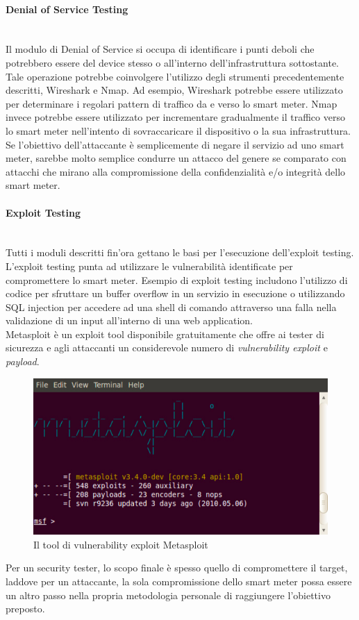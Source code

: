 \paragraph{Denial of Service Testing}\mbox{}\\
Il modulo di Denial of Service si occupa di identificare i punti deboli che potrebbero essere del device stesso o all'interno dell'infrastruttura sottostante. Tale operazione potrebbe coinvolgere l'utilizzo degli strumenti precedentemente descritti, Wireshark e Nmap. Ad esempio, Wireshark potrebbe essere utilizzato per determinare i regolari pattern di traffico da e verso lo smart meter. Nmap invece potrebbe essere utilizzato per incrementare gradualmente il traffico verso lo smart meter nell'intento di sovraccaricare il dispositivo o la sua infrastruttura.\\
Se l'obiettivo dell'attaccante è semplicemente di negare il servizio ad uno smart meter, sarebbe molto semplice condurre un attacco del genere se comparato con attacchi che mirano alla compromissione della confidenzialità e/o integrità dello smart meter.

\paragraph{Exploit Testing}\mbox{}\\
Tutti i moduli descritti fin'ora gettano le basi per l'esecuzione dell'exploit testing. L'exploit testing punta ad utilizzare le vulnerabilità identificate per compromettere lo smart meter. Esempio di exploit testing includono l'utilizzo di codice per sfruttare un buffer overflow in un servizio in esecuzione o utilizzando SQL injection per accedere ad una shell di comando attraverso una falla nella validazione di un input all'interno di una web application.\\
Metasploit è un exploit tool disponibile gratuitamente che offre ai tester di sicurezza e agli attaccanti un considerevole numero di \emph{vulnerability exploit} e \emph{payload}. \cite{metasploit}
\begin{figure}[hbtp]
	\centering
	\includegraphics[scale=.3]{imgs/attack/metasploit.png}
	\caption{Il tool di vulnerability exploit Metasploit}
	\label{metasploit_img}
\end{figure}
Per un security tester, lo scopo finale è spesso quello di compromettere il target, laddove per un attaccante, la sola compromissione dello smart meter possa essere un altro passo nella propria metodologia personale di raggiungere l'obiettivo preposto.



